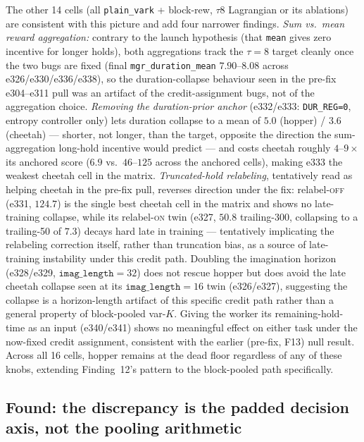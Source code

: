 \documentclass[10pt]{article}
\begin{document}
The other 14 cells (all \texttt{plain\_vark} + block-rew, $\tau8$
Lagrangian or its ablations) are consistent with this picture and add four
narrower findings. \emph{Sum vs.\ mean reward aggregation:} contrary to the
launch hypothesis (that \texttt{mean} gives zero incentive for longer
holds), both aggregations track the $\tau{=}8$ target cleanly once the two
bugs are fixed (final \texttt{mgr\_duration\_mean} $7.90$--$8.08$ across
e326/e330/e336/e338), so the duration-collapse behaviour seen in the
pre-fix e304--e311 pull was an artifact of the credit-assignment bugs, not
of the aggregation choice. \emph{Removing the duration-prior anchor}
(e332/e333: \texttt{DUR\_REG=0}, entropy controller only) lets duration
collapse to a mean of $5.0$ (hopper) / $3.6$ (cheetah) --- shorter, not
longer, than the target, opposite the direction the sum-aggregation
long-hold incentive would predict --- and costs cheetah roughly $4$--$9\times$
its anchored score ($6.9$ vs.\ $46$--$125$ across the anchored cells),
making e333 the weakest cheetah cell in the matrix. \emph{Truncated-hold
relabeling}, tentatively read as helping cheetah in the pre-fix pull,
reverses direction under the fix: relabel-\textsc{off} (e331, $124.7$) is
the single best cheetah cell in the matrix and shows no late-training
collapse, while its relabel-\textsc{on} twin (e327, $50.8$ trailing-300,
collapsing to a trailing-50 of $7.3$) decays hard late in training ---
tentatively implicating the relabeling correction itself, rather than
truncation bias, as a source of late-training instability under this
credit path. Doubling the imagination horizon (e328/e329, $\texttt{imag\_length}{=}32$)
does not rescue hopper but does avoid the late cheetah collapse seen at its
$\texttt{imag\_length}{=}16$ twin (e326/e327), suggesting the collapse is a
horizon-length artifact of this specific credit path rather than a general
property of block-pooled var-$K$. Giving the worker its remaining-hold-time
as an input (e340/e341) shows no meaningful effect on either task under the
now-fixed credit assignment, consistent with the earlier (pre-fix, F13)
null result. Across all 16 cells, hopper remains at the dead floor
regardless of any of these knobs, extending Finding~12's pattern to the
block-pooled path specifically.


\subsection{Found: the discrepancy is the padded decision axis, not the
pooling arithmetic}
\label{sec:paddedaxis}
\end{document}

